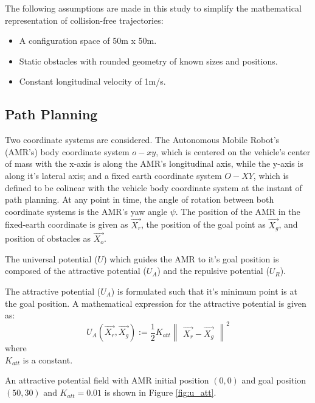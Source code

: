 \documentclass[a4paper, twocolumn]{article}
\begin{document}
The following assumptions are made in this study to simplify the mathematical representation of collision-free trajectories:
\begin{itemize}[itemsep=2pt]
    \item A configuration space of 50m x 50m.
    \item Static obstacles with rounded geometry of known sizes and positions.
    \item Constant longitudinal velocity of 1m/s.
\end{itemize}

\subsection{Path Planning}
Two coordinate systems are considered. The Autonomous Mobile Robot's (AMR's) body coordinate system $\mathit{o-xy}$, 
which is centered on the vehicle's center of mass with the x-axis is along the AMR's longitudinal axis, 
while the y-axis is along it's lateral axis; and a fixed earth coordinate system $\mathit{O-XY}$, 
which is defined to be colinear with the vehicle body coordinate system at the instant of path planning. 
At any point in time, the angle of rotation between both coordinate systems is the AMR's yaw angle $\psi$. 
The position of the AMR in the fixed-earth coordinate is given as $\vec{X_{r}}$, 
the position of the goal point as $\vec{X_{g}}$, and position of obstacles as $\vec{X_{o}}$.

The universal potential ($U$) which guides the AMR to it's goal position is composed of the attractive potential ($U_{A}$) 
and the repulsive potential ($U_{R}$).

The attractive potential ($U_{A}$) is formulated such that it's minimum point is at the goal position. 
A mathematical expression for the attractive potential is given as:
$$
U_{A}(\vec{X_{r}}, \vec{X_{g}}):= \frac{1}{2} K_{att} {\begin{Vmatrix}\vec{X_{r}} - \vec{X_{g}}\end{Vmatrix}}^{2}
$$
\noindent
where \\
$K_{att}$ is a constant.

\noindent
An attractive potential field with AMR initial position $(0, 0)$ and 
goal position $(50, 30)$ and $K_{att}= 0.01$ is shown in Figure \ref{fig:u_att}.
\end{document}
